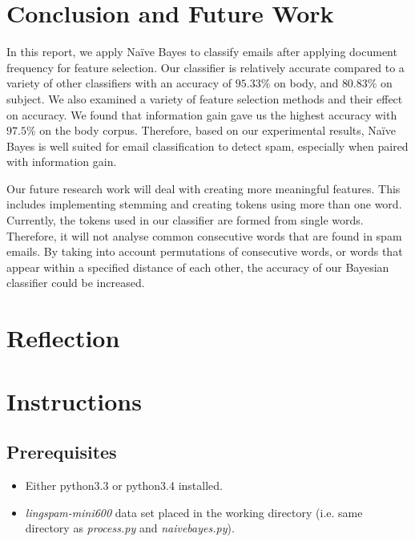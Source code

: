\documentclass[10pt, a4paper]{article}
\begin{document}
\section{Conclusion and Future Work}


In this report, we apply Na\"ive Bayes to classify emails after applying document frequency for feature selection. Our classifier is relatively accurate compared to a variety of other classifiers with an accuracy of $95.33\%$ on body, and $80.83\%$ on subject. We also examined a variety of feature selection methods and their effect on accuracy. We found that information gain gave us the highest accuracy with $97.5\%$ on the body corpus. Therefore, based on our experimental results, Na\"ive Bayes is well suited for email classification to detect spam, especially when paired with information gain.

Our future research work will deal with creating more meaningful features. This includes implementing stemming and creating tokens using more than one word. Currently, the tokens used in our classifier are formed from single words. Therefore, it will not analyse common consecutive words that are found in spam emails. By taking into account permutations of consecutive words, or words that appear within a specified distance of each other, the accuracy of our Bayesian classifier could be increased.

\section{Reflection}

\section{Instructions}

\subsection{Prerequisites}

\begin{itemize}
\item Either python3.3 or python3.4 installed.
\item \textit{lingspam-mini600} data set placed in the working directory (i.e. same directory as \textit{process.py} and \textit{naivebayes.py}).
\end{itemize}
\end{document}
